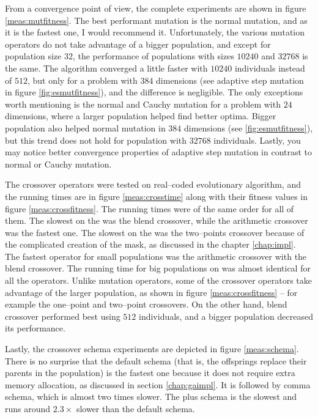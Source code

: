 From a convergence point of view, the complete experiments are shown in figure \ref{meas:mutfitness}. The best performant mutation is the normal mutation, and as it is the fastest one, I would recommend it. Unfortunately, the various mutation operators do not take advantage of a bigger population, and except for population size $32$, the performance of populations with sizes $10240$ and $32768$ is the same. The algorithm converged a little faster with $10240$ individuals instead of $512$, but only for a problem with $384$ dimensions (see adaptive step mutation in figure \ref{fig:esmutfitness}), and the difference is negligible. The only exceptions worth mentioning is the normal and Cauchy mutation for a problem with $24$ dimensions, where a larger population helped find better optima. Bigger population also helped normal mutation in $384$ dimensions (see \ref{fig:esmutfitness}), but this trend does not hold for population with $32768$ individuals. Lastly, you may notice better convergence properties of adaptive step mutation in contrast to normal or Cauchy mutation.

The crossover operators were tested on real--coded evolutionary algorithm, and the running times are in figure \ref{meas:crosstime} along with their fitness values in figure \ref{meas:crossfitness}. The running times were of the same order for all of them. The slowest on the \cpu was the blend crossover, while the arithmetic crossover was the fastest one. The slowest on the \cpu was the two--points crossover because of the complicated creation of the mask, as discussed in the chapter \ref{chap:impl}. The fastest operator for small populations was the arithmetic crossover with the blend crossover. The running time for big populations on \gpu was almost identical for all the operators. Unlike mutation operators, some of the crossover operators take advantage of the larger population, as shown in figure \ref{meas:crossfitness} -- for example the one--point and two--point crossovers. On the other hand, blend crossover performed best using $512$ individuals, and a bigger population decreased its performance.

Lastly, the crossover schema experiments are depicted in figure \ref{meas:schema}. There is no surprise that the default schema (that is, the offsprings replace their parents in the population) is the fastest one because it does not require extra memory allocation, as discussed in section \ref{chap:gaimpl}. It is followed by comma schema, which is almost two times slower. The plus schema is the slowest and runs around $2.3\times$ slower than the default schema.

